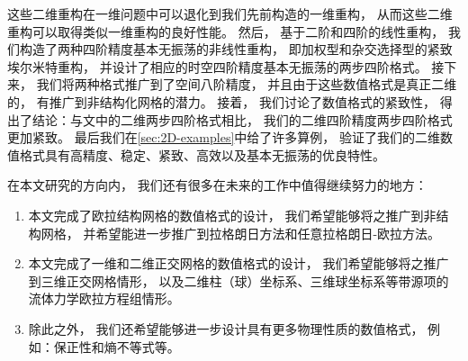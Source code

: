 \begin{enumerate}
            这些二维重构在一维问题中可以退化到我们先前构造的一维重构，
            从而这些二维重构可以取得类似一维重构的良好性能。
            然后，
            基于二阶和四阶的线性重构，
            我们构造了两种四阶精度基本无振荡的非线性重构，
            即加权型和杂交选择型的紧致埃尔米特重构，
            并设计了相应的时空四阶精度基本无振荡的两步四阶格式。
            接下来，
            我们将两种格式推广到了空间八阶精度，
            并且由于这些数值格式是真正二维的，
            有推广到非结构化网格的潜力。
            接着，
            我们讨论了数值格式的紧致性，
            得出了结论：与文\cite{du2018hermite}中的二维两步四阶格式相比，
            我们的二维四阶精度两步四阶格式更加紧致。
            最后我们在\cref{sec:2D-examples}中给了许多算例，
            验证了我们的二维数值格式具有高精度、稳定、紧致、高效以及基本无振荡的优良特性。
\end{enumerate}

在本文研究的方向内，
我们还有很多在未来的工作中值得继续努力的地方：
\begin{enumerate}
      \item 本文完成了欧拉结构网格的数值格式的设计，
            我们希望能够将之推广到非结构网格，
            并希望能进一步推广到拉格朗日方法和任意拉格朗日-欧拉方法。
      \item 本文完成了一维和二维正交网格的数值格式的设计，
            我们希望能够将之推广到三维正交网格情形，
            以及二维柱（球）坐标系、三维球坐标系等带源项的流体力学欧拉方程组情形。
      \item 除此之外，
            我们还希望能够进一步设计具有更多物理性质的数值格式，
            例如：保正性和熵不等式等。
\end{enumerate}